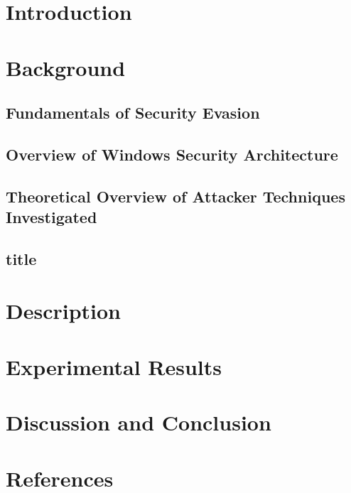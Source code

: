 \documentclass[11pt]{article}
\begin{document}
		\newpage
		\section{Introduction}
		\section{Background}
			\subsection{Fundamentals of Security Evasion}
			\subsection{Overview of Windows Security Architecture}
			\subsection{Theoretical Overview of Attacker Techniques Investigated}
			\subsection{title}
			
		\section{Description}

		\section{Experimental Results}
		\section{Discussion and Conclusion}
		\section{References}
		
	
\end{document}
